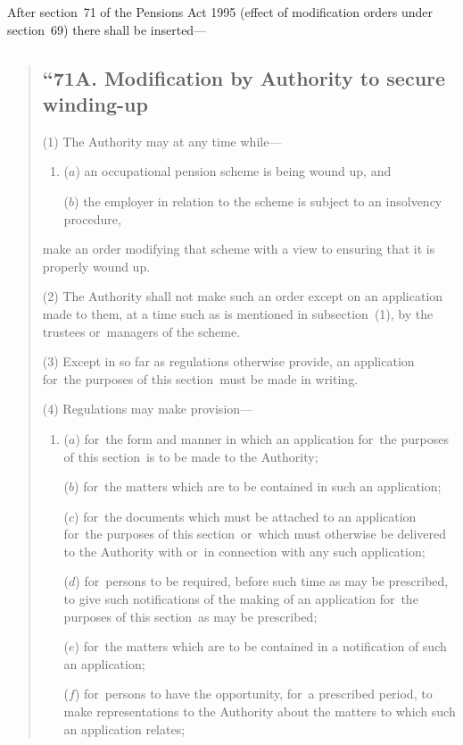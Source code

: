 \documentclass[12pt,a4paper]{article}
\begin{document}
After section~71 of the Pensions Act 1995 (effect of modification orders under section~69) there shall be inserted—
\begin{quotation}
\subsection*{\sloppy “71A. Modification by Authority to secure winding\hspace{0pt}-up}

(1) The Authority may at any time while—
\begin{enumerate}\item[]
($a$) an occupational pension scheme is being wound up, and

($b$) the employer in relation to the scheme is subject to an insolvency procedure,
\end{enumerate}
make an order modifying that scheme with a view to ensuring that it is properly wound up.

(2) The Authority shall not make such an order except on an application made to them, at a time such as is mentioned in subsection~(1), by the trustees or~managers of the scheme.

(3) Except in so far as regulations otherwise provide, an application for~the purposes of this section~must be made in writing.

(4) Regulations may make provision—
\begin{enumerate}\item[]
($a$) for~the form and manner in which an application for~the purposes of this section~is to be made to the Authority;

($b$) for~the matters which are to be contained in such an application;

($c$) for~the documents which must be attached to an application for~the purposes of this section~or~which must otherwise be delivered to the Authority with or~in connection with any such application;

($d$) for~persons to be required, before such time as may be prescribed, to give such notifications of the making of an application for~the purposes of this section~as may be prescribed;

($e$) for~the matters which are to be contained in a notification of such an application;

($f$) for~persons to have the opportunity, for~a prescribed period, to make representations to the Authority about the matters to which such an application relates;


\end{enumerate}
\end{quotation}
\end{document}
